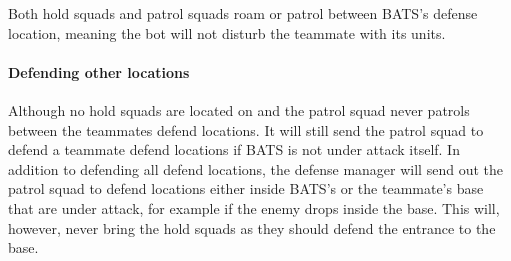 Both hold squads and patrol squads roam or patrol between BATS’s defense location, meaning the bot will not disturb the teammate with its units.

\paragraph{Defending other locations}
Although no hold squads are located on and the patrol squad never patrols between the teammates defend locations. It will still send the patrol squad to defend a teammate defend locations if BATS is not under attack itself. In addition to defending all defend locations, the defense manager will send out the patrol squad to defend locations either inside BATS’s or the teammate's base that are under attack, for example if the enemy drops inside the base. This will, however, never bring the hold squads as they should defend the entrance to the base.
